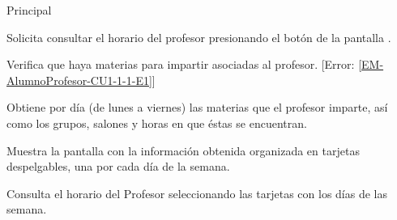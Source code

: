 \begin{UCtrayectoria}{Principal}

	\UCpaso [\UCactor] Solicita consultar el horario del profesor presionando el botón  de la pantalla .

	\UCpaso Verifica que haya materias para impartir asociadas al profesor. [Error: \ref{EM-AlumnoProfesor-CU1-1-1-E1}]

	\UCpaso Obtiene por día (de lunes a viernes) las materias que el profesor imparte, así como los grupos, salones y horas en que éstas se encuentran. 

	\UCpaso Muestra la pantalla  con la información obtenida organizada en tarjetas despelgables, una por cada día de la semana. 

	\UCpaso[\UCactor] Consulta el horario del Profesor seleccionando las tarjetas con los días de las semana.

\end{UCtrayectoria}




